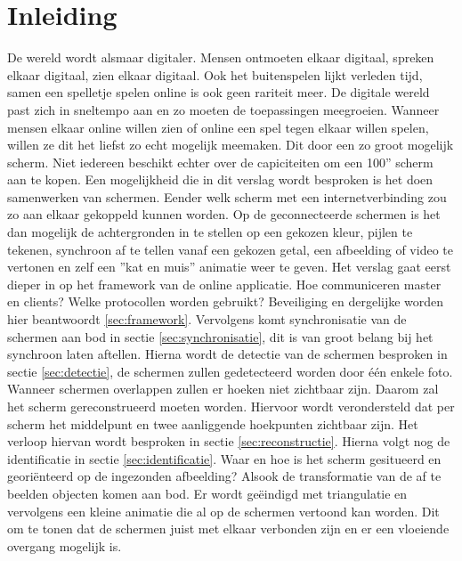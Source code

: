 \section{Inleiding}
De wereld wordt alsmaar digitaler. Mensen ontmoeten elkaar digitaal, spreken elkaar digitaal, zien elkaar digitaal. Ook het buitenspelen lijkt verleden tijd, samen een spelletje spelen online is ook geen rariteit meer. De digitale wereld past zich in sneltempo aan en zo moeten de toepassingen meegroeien. Wanneer mensen elkaar online willen zien of online een spel tegen elkaar willen spelen, willen ze dit het liefst zo echt mogelijk meemaken. Dit door een zo groot mogelijk scherm. Niet iedereen beschikt echter over de capiciteiten om een 100'' scherm aan te kopen. Een mogelijkheid die in dit verslag wordt besproken is het doen samenwerken van schermen. Eender welk scherm met een internetverbinding zou zo aan elkaar gekoppeld kunnen worden. Op de geconnecteerde schermen is het dan mogelijk de achtergronden in te stellen op een gekozen kleur, pijlen te tekenen, synchroon af te tellen vanaf een gekozen getal, een afbeelding of video te vertonen en zelf een ''kat en muis'' animatie weer te geven.
\bigskip
Het verslag gaat eerst dieper in op het framework van de online applicatie. Hoe communiceren master en clients? Welke  protocollen worden gebruikt? Beveiliging en dergelijke worden hier beantwoordt \ref{sec:framework}. Vervolgens komt synchronisatie van de schermen aan bod in sectie \ref{sec:synchronisatie}, dit is van groot belang bij het synchroon laten aftellen. Hierna wordt de detectie van de schermen besproken in sectie \ref{sec:detectie}, de schermen zullen gedetecteerd worden door één enkele foto. Wanneer schermen overlappen zullen er hoeken niet zichtbaar zijn. Daarom zal het scherm gereconstrueerd moeten worden. Hiervoor wordt verondersteld dat per scherm het middelpunt en twee aanliggende hoekpunten zichtbaar zijn. Het verloop hiervan wordt besproken in sectie \ref{sec:reconstructie}. Hierna volgt nog de identificatie in sectie \ref{sec:identificatie}. Waar en hoe is het scherm gesitueerd en georiënteerd op de ingezonden afbeelding? Alsook de transformatie van de af te beelden objecten komen aan bod. Er wordt geëindigd met triangulatie en vervolgens een kleine animatie die al op de schermen vertoond kan worden. Dit om te tonen dat de schermen juist met elkaar verbonden zijn en er een vloeiende overgang mogelijk is. 